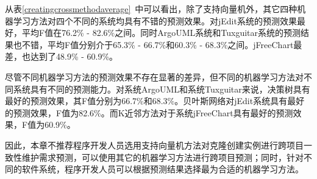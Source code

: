 从表\ref{creatingcrossmethodaverage}~中可以看出，除了支持向量机外，其它四种机器学习方法对四个不同的系统均具有不错的预测效果。对jEdit系统的预测效果最好，平均F值在76.2\% - 82.6\%之间。同时ArgoUML系统和Tuxguitar系统的预测结果也不错，平均F值分别介于65.3\% - 66.7\%和60.3\% - 68.3\%之间。jFreeChart最差，也达到了48.9\% - 60.9\%。

尽管不同机器学习方法的预测效果不存在显著的差异，但不同的机器学习方法对不同系统具有不同的预测能力。对系统ArgoUML和系统Tuxguitar来说，决策树具有最好的预测效果，其F值分别为66.7\%和68.3\%。贝叶斯网络对jEdit系统具有最好的预测效果，F值为82.6\%。而K近邻方法对于系统jFreeChart具有最好的预测效果，F值为60.9\%。

因此，本章不推荐程序开发人员选用支持向量机方法对克隆创建实例进行跨项目一致性维护需求预测，可以使用其它的机器学习方法进行跨项目预测；同时，针对不同的软件系统，程序开发人员可以根据预测结果选择最为合适的机器学习方法。

